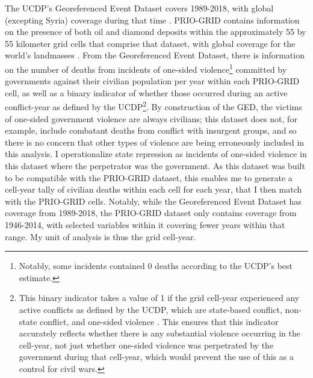 The UCDP's Georeferenced Event Dataset \cite{SundbertMelander13} covers 1989-2018, with global (excepting Syria) coverage during that time \cite{Stina19}. PRIO-GRID contains information on the presence of both oil and diamond deposits within the approximately 55 by 55 kilometer grid cells that comprise that dataset, with global coverage for the world’s landmasses \cite{LRT7,Gilmore5,LGG5}. From the Georeferenced Event Dataset, there is information on the number of deaths from incidents of one-sided violence\footnote{Notably, some incidents contained 0 deaths according to the UCDP’s best estimate.} committed by governments against their civilian population per year within each PRIO-GRID cell, as well as a binary indicator of whether those occurred during an active conflict-year as defined by the UCDP\footnote{This binary indicator takes a value of 1 if the grid cell-year experienced any active conflicts as defined by the UCDP, which are state-based conflict, non-state conflict, and one-sided violence \cite{Stina19}. This ensures that this indicator accurately reflects whether there is any substantial violence occurring in the cell-year, not just whether one-sided violence was perpetrated by the government during that cell-year, which would prevent the use of this as a control for civil wars.}. By construction of the GED, the victims of one-sided government violence are always civilians; this dataset does not, for example, include combatant deaths from conflict with insurgent groups, and so there is no concern that other types of violence are being erroneously included in this analysis. I operationalize state repression as incidents of one-sided violence in this dataset where the perpetrator was the government. As this dataset was built to be compatible with the PRIO-GRID dataset, this enables me to generate a cell-year tally of civilian deaths within each cell for each year, that I then match with the PRIO-GRID cells. Notably, while the Georeferenced Event Dataset has coverage from 1989-2018, the PRIO-GRID dataset only contains coverage from 1946-2014, with selected variables within it covering fewer years within that range. My unit of analysis is thus the grid cell-year.

